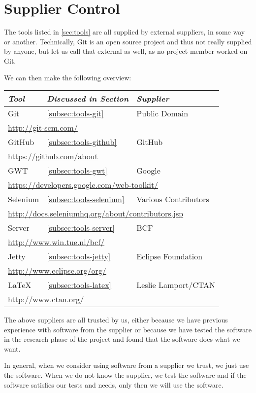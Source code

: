 \chapter{Supplier Control}
\label{chap:suppliercontrol}
The tools listed in \ref{sec:tools} are all supplied by external suppliers, in some way or another. Technically, Git is an open source project and thus not really supplied by anyone, but let us call that external as well, as no project member worked on Git.

We can then make the following overview:

\begin{center}
\begin{tabular}{lll}
	\toprule
	\emph{Tool} & \emph{Discussed in Section} & \emph{Supplier} \\
	\midrule[1pt]
	Git      & \ref{subsec:tools-git}      & Public Domain \\
	\multicolumn{3}{l}{\url{http://git-scm.com/}} \\
	\midrule
	GitHub   & \ref{subsec:tools-github}   & GitHub \\
	\multicolumn{3}{l}{\url{https://github.com/about}} \\
	\midrule
	GWT      & \ref{subsec:tools-gwt}      & Google \\
	\multicolumn{3}{l}{\url{https://developers.google.com/web-toolkit/}} \\
	\midrule
	Selenium & \ref{subsec:tools-selenium} & Various Contributors \\
	\multicolumn{3}{l}{\url{http://docs.seleniumhq.org/about/contributors.jsp}} \\
	\midrule
	Server   & \ref{subsec:tools-server}   & BCF \\
	\multicolumn{3}{l}{\url{http://www.win.tue.nl/bcf/}} \\
	\midrule
	Jetty    & \ref{subsec:tools-jetty}    & Eclipse Foundation \\
	\multicolumn{3}{l}{\url{http://www.eclipse.org/org/}} \\
	\midrule
	\LaTeX   & \ref{subsec:tools-latex}    & Leslie Lamport/CTAN \\
	\multicolumn{3}{l}{\url{http://www.ctan.org/}} \\
	\bottomrule
\end{tabular}
\end{center}

\noindent The above suppliers are all trusted by us, either because we have previous experience with software from the supplier or because we have tested the software in the research phase of the project and found that the software does what we want.

In general, when we consider using software from a supplier we trust, we just use the software. When we do not know the supplier, we test the software and if the software satisfies our tests and needs, only then we will use the software.